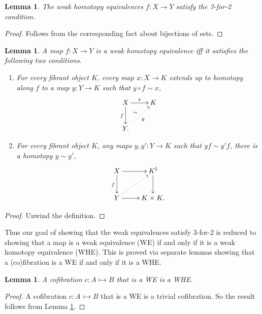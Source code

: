 \documentclass[11pt]{article}
\newcommand{\mono}{\ensuremath{\rightarrowtail}}
\newcommand{\ra}{\ensuremath{\rightarrow}}
\newcommand{\I}{\ensuremath{\mathrm{I}}}
\newtheorem{lemma}[theorem]{Lemma}
\theoremstyle{remark}
\theoremstyle{definition}
\begin{document}
\begin{lemma}
The weak homotopy equivalences $f : X\ra Y$ satisfy the 3-for-2 condition. 
\end{lemma}
\begin{proof}
Follows from the corresponding fact about bijections of sets.
\end{proof}

\begin{lemma}\label{lem:WHEunwound}
A map $f : X\ra Y$ is a \emph{weak homotopy equivalence} iff it satisfies the following two conditions.
\begin{enumerate}
\item For every fibrant object $K$, every map $x : X \ra K$ extends up to homotopy along $f$ to a map $y:Y\ra K$ such that $y\circ f \sim x$,
\[
\xymatrix{
X \ar[d]_{f} \ar[r]^{x}  & K\\
Y \ar@{..>}[ru]_{y}^{\sim}. &
}
\]
\item For every fibrant object $K$, any maps $y, y' : Y \ra K$ such that $yf \sim y'f$, there is a homotopy $y\sim y'$,
\[
\xymatrix{
X \ar[d]_{f} \ar[r]  & K^\I\ar[d] \\
Y \ar@{..>}[ru] \ar[r] & K\times K.
}
\]
\end{enumerate}
\end{lemma}
\begin{proof}
Unwind the definition.
\end{proof}

Thus our goal of showing that the weak equivalences satisfy 3-for-2 is reduced to showing that a map is a weak equivalence (WE) if and only if it is a weak homotopy equivalence (WHE). This is proved via separate lemmas showing that a (co)fibration is a WE if and only if it is a WHE. 

\begin{lemma}\label{lemma:CofWEtoWHE}
A cofibration $c : A \mono B$ that is a WE is a WHE.
\end{lemma}

\begin{proof}
A cofibration $c : A \mono B$ that is a WE is a trivial cofibration. 
So the result follows from Lemma \ref{lem:WHEunwound}.
\end{proof}
\end{document}

